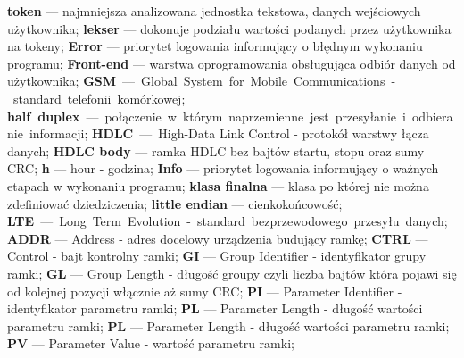 \textbf{token} --- najmniejsza analizowana jednostka tekstowa, danych wejściowych użytkownika;\newline
\textbf{lekser} --- dokonuje podziału wartości podanych przez użytkownika na tokeny;\newline
\textbf{Error} --- priorytet logowania informujący o błędnym wykonaniu programu;\newline
\textbf{Front-end} --- warstwa oprogramowania obsługująca odbiór danych od użytkownika;\newline
\textbf{GSM} --- Global System for Mobile Communications - standard telefonii komórkowej;\newline
\textbf{half duplex} --- połączenie w którym naprzemienne jest przesyłanie i odbieranie informacji;\newline
\textbf{HDLC} --- High-Data Link Control - protokół warstwy łącza danych;\newline
\textbf{HDLC body} --- ramka HDLC bez bajtów startu, stopu oraz sumy CRC;\newline
\textbf{h} --- hour - godzina;\newline
\textbf{Info} --- priorytet logowania informujący o ważnych etapach w wykonaniu programu;\newline
\textbf{klasa finalna} --- klasa po której nie można zdefiniować dziedziczenia;\newline
\textbf{little endian} --- cienkokońcowość;\newline
\textbf{LTE} --- Long Term Evolution - standard bezprzewodowego przesyłu danych;\newline
\textbf{ADDR} --- Address - adres docelowy urządzenia budujący ramkę;\newline
\textbf{CTRL} --- Control - bajt kontrolny ramki;\newline
\textbf{GI} --- Group Identifier - identyfikator grupy ramki;\newline
\textbf{GL} --- Group Length - długość groupy czyli liczba bajtów która pojawi się od kolejnej pozycji włącznie aż sumy CRC;\newline
\textbf{PI} --- Parameter Identifier - identyfikator parametru ramki;\newline
\textbf{PL} --- Parameter Length - długość wartości parametru ramki;\newline
\textbf{PL} --- Parameter Length - długość wartości parametru ramki;\newline
\textbf{PV} --- Parameter Value - wartość parametru ramki;\newline

